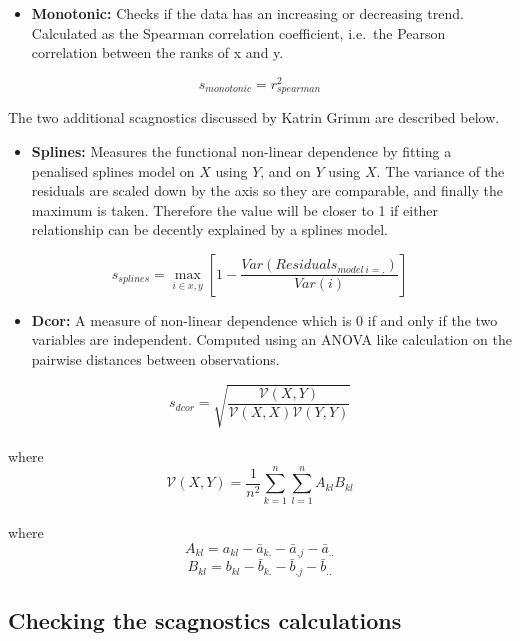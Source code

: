 \begin{itemize}
\tightlist
\item
  \textbf{Monotonic:} Checks if the data has an increasing or decreasing
  trend. Calculated as the Spearman correlation coefficient, i.e.~the
  Pearson correlation between the ranks of x and y.
\end{itemize}

\[s_{monotonic} = r^2_{spearman}\]

The two additional scagnostics discussed by Katrin Grimm are described
below.

\begin{itemize}
\tightlist
\item
  \textbf{Splines:} Measures the functional non-linear dependence by
  fitting a penalised splines model on \(X\) using \(Y\), and on \(Y\)
  using \(X\). The variance of the residuals are scaled down by the axis
  so they are comparable, and finally the maximum is taken. Therefore
  the value will be closer to 1 if either relationship can be decently
  explained by a splines model.
\end{itemize}

\[s_{splines}=\max_{i\in x,y}[1-\frac{Var(Residuals_{model~i=.})}{Var(i)}]\]

\begin{itemize}
\tightlist
\item
  \textbf{Dcor:} A measure of non-linear dependence which is 0 if and
  only if the two variables are independent. Computed using an ANOVA
  like calculation on the pairwise distances between observations.
\end{itemize}

\[s_{dcor}= \sqrt{\frac{\mathcal{V}(X,Y)}{\mathcal{V}(X,X)\mathcal{V}(Y,Y)}}\]\\
where \[\mathcal{V}
(X,Y)=\frac{1}{n^2}\sum_{k=1}^n\sum_{l=1}^nA_{kl}B_{kl}\]\\
where \[A_{kl}=a_{kl}-\bar{a}_{k.}-\bar{a}_{.j}-\bar{a}_{..}\]
\[B_{kl}=b_{kl}-\bar{b}_{k.}-\bar{b}_{.j}-\bar{b}_{..}\]

\hypertarget{checking-the-scagnostics-calculations}{%
\subsection{Checking the scagnostics
calculations}\label{checking-the-scagnostics-calculations}}

